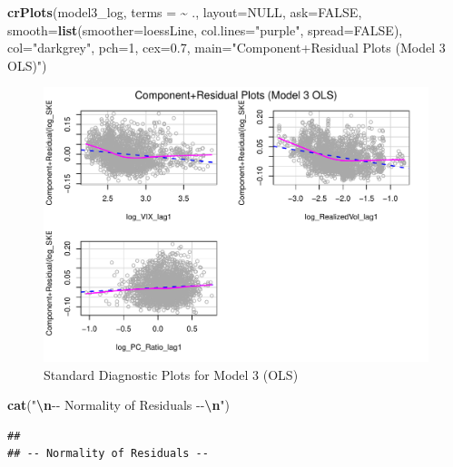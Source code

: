 \documentclass[
]{article}
\newenvironment{Shaded}{\begin{snugshade}}{\end{snugshade}}
\newcommand{\AttributeTok}[1]{\textcolor[rgb]{0.13,0.29,0.53}{#1}}
\newcommand{\ConstantTok}[1]{\textcolor[rgb]{0.56,0.35,0.01}{#1}}
\newcommand{\DecValTok}[1]{\textcolor[rgb]{0.00,0.00,0.81}{#1}}
\newcommand{\FloatTok}[1]{\textcolor[rgb]{0.00,0.00,0.81}{#1}}
\newcommand{\FunctionTok}[1]{\textcolor[rgb]{0.13,0.29,0.53}{\textbf{#1}}}
\newcommand{\NormalTok}[1]{#1}
\newcommand{\SpecialCharTok}[1]{\textcolor[rgb]{0.81,0.36,0.00}{\textbf{#1}}}
\newcommand{\StringTok}[1]{\textcolor[rgb]{0.31,0.60,0.02}{#1}}
\begin{document}
\begin{Shaded}
\begin{Highlighting}[]
  \FunctionTok{crPlots}\NormalTok{(model3\_log, }\AttributeTok{terms =} \SpecialCharTok{\textasciitilde{}}\NormalTok{ ., }\AttributeTok{layout=}\ConstantTok{NULL}\NormalTok{, }\AttributeTok{ask=}\ConstantTok{FALSE}\NormalTok{, }\AttributeTok{smooth=}\FunctionTok{list}\NormalTok{(}\AttributeTok{smoother=}\NormalTok{loessLine, }\AttributeTok{col.lines=}\StringTok{"purple"}\NormalTok{, }\AttributeTok{spread=}\ConstantTok{FALSE}\NormalTok{), }\AttributeTok{col=}\StringTok{"darkgrey"}\NormalTok{, }\AttributeTok{pch=}\DecValTok{1}\NormalTok{, }\AttributeTok{cex=}\FloatTok{0.7}\NormalTok{, }\AttributeTok{main=}\StringTok{"Component+Residual Plots (Model 3 OLS)"}\NormalTok{)}
\end{Highlighting}
\end{Shaded}

\begin{figure}
\centering
\includegraphics{FinalProject_files/figure-latex/model3-parsimonious-log-log-2.pdf}
\caption{Standard Diagnostic Plots for Model 3 (OLS)}
\end{figure}

\begin{Shaded}
\begin{Highlighting}[]
  \FunctionTok{cat}\NormalTok{(}\StringTok{"}\SpecialCharTok{\textbackslash{}n}\StringTok{{-}{-} Normality of Residuals {-}{-}}\SpecialCharTok{\textbackslash{}n}\StringTok{"}\NormalTok{)}
\end{Highlighting}
\end{Shaded}

\begin{verbatim}
## 
## -- Normality of Residuals --
\end{verbatim}
\end{document}
